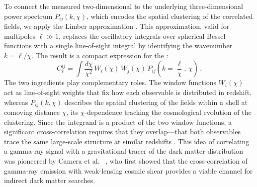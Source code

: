 To connect the measured two-dimensional \APS to the underlying three-dimensional power spectrum $P_{ij}(k,\chi)$, which encodes the spatial clustering of the correlated fields, we apply the Limber approximation \cite{Limber:1953apj}.
This approximation, valid for multipoles $\ell \gg 1$, replaces the oscillatory integrals over spherical Bessel functions with a single line-of-sight integral by identifying the wavenumber $k = \ell / \chi$.
The result is a compact expression for the \APS \cite{Fornengo:2013rga,Camera:2012cj}:
\begin{equation}
	C_\ell^{ij} = \int \frac{d\chi}{\chi^2}\, W_i(\chi)\, W_j(\chi)\, P_{ij}\!
	\left(k = \frac{\ell}{\chi},\, \chi\right)\,.
	\label{eq:limber_aps}
\end{equation}
The two ingredients play complementary roles.
The window functions $W_i(\chi)$ act as line-of-sight weights that fix how each observable is distributed in redshift, whereas $P_{ij}(k,\chi)$ describes the spatial clustering of the fields within a shell at comoving distance $\chi$, its $\chi$-dependence tracking the cosmological evolution of the clustering.
Since the integrand is a product of the two window functions, a significant cross-correlation requires that they overlap---that both observables trace the same large-scale structure at similar redshifts \cite{Fornengo:2013rga}.
This idea of correlating a gamma-ray signal with a gravitational tracer of the dark matter distribution was pioneered by Camera et al.
\ \cite{Camera:2012cj}, who first showed that the cross-correlation of gamma-ray emission with weak-lensing cosmic shear provides a viable channel for indirect dark matter searches.

